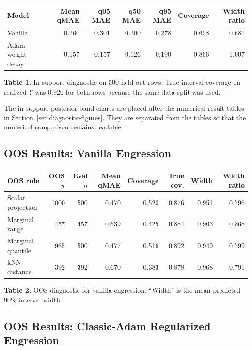 \documentclass[11pt]{article}
\begin{document}
\begin{center}
\small
\begin{tabular}{lrrrrrr}
\toprule
Model & Mean qMAE & q05 MAE & q50 MAE & q95 MAE & Coverage & Width ratio \\
\midrule
Vanilla & 0.260 & 0.301 & 0.200 & 0.278 & 0.698 & 0.681 \\
Adam weight decay & 0.157 & 0.157 & 0.126 & 0.190 & 0.866 & 1.007 \\
\bottomrule
\end{tabular}
\end{center}

\noindent\textbf{Table 1.} In-support diagnostic on \(500\) held-out rows.
True interval coverage on realized \(Y\) was \(0.920\) for both rows because
the same data split was used.
\vspace{0.8em}

The in-support posterior-band charts are placed after the numerical result
tables in Section~\ref{sec:diagnostic-figures}.  They are separated from the
tables so that the numerical comparison remains readable.

\subsection{OOS Results: Vanilla Engression}

\begin{center}
\small
\begin{tabular}{lrrrrrrr}
\toprule
OOS rule & OOS \(n\) & Eval \(n\) & Mean qMAE & Coverage & True cov. & Width & Width ratio \\
\midrule
Scalar projection & 1000 & 500 & 0.470 & 0.520 & 0.876 & 0.951 & 0.796 \\
Marginal range & 457 & 457 & 0.639 & 0.425 & 0.884 & 0.963 & 0.868 \\
Marginal quantile & 965 & 500 & 0.477 & 0.516 & 0.892 & 0.949 & 0.799 \\
kNN distance & 392 & 392 & 0.670 & 0.383 & 0.878 & 0.968 & 0.791 \\
\bottomrule
\end{tabular}
\end{center}

\noindent\textbf{Table 2.} OOS diagnostic for vanilla engression.  ``Width''
is the mean predicted \(90\%\) interval width.
\vspace{0.8em}

\subsection{OOS Results: Classic-Adam Regularized Engression}
\end{document}
